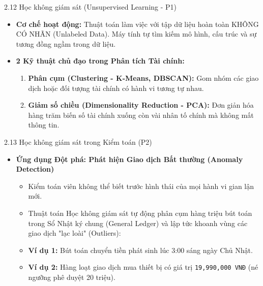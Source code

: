 \documentclass[aspectratio=169]{beamer}
\begin{document}
\begin{frame}{2.12 Học không giám sát (Unsupervised Learning - P1)}
    \begin{itemize}
        \item \textbf{Cơ chế hoạt động:} Thuật toán làm việc với tập dữ liệu hoàn toàn KHÔNG CÓ NHÃN (Unlabeled Data). Máy tính tự tìm kiếm mô hình, cấu trúc và sự tương đồng ngầm trong dữ liệu.
        \item \textbf{2 Kỹ thuật chủ đạo trong Phân tích Tài chính:}
        \begin{enumerate}
            \item \textbf{Phân cụm (Clustering - K-Means, DBSCAN):} Gom nhóm các giao dịch hoặc đối tượng tài chính có hành vi tương tự nhau.
            \item \textbf{Giảm số chiều (Dimensionality Reduction - PCA):} Đơn giản hóa hàng trăm biến số tài chính xuống còn vài nhân tố chính mà không mất thông tin.
        \end{enumerate}
    \end{itemize}
\end{frame}

\begin{frame}{2.13 Học không giám sát trong Kiểm toán (P2)}
    \begin{itemize}
        \item \textbf{Ứng dụng Đột phá: Phát hiện Giao dịch Bất thường (Anomaly Detection)}
        \begin{itemize}
            \item Kiểm toán viên không thể biết trước hình thái của mọi hành vi gian lận mới.
            \item Thuật toán Học không giám sát tự động phân cụm hàng triệu bút toán trong Sổ Nhật ký chung (General Ledger) và lập tức khoanh vùng các giao dịch "lạc loài" (Outliers):
            \item \textbf{Ví dụ 1:} Bút toán chuyển tiền phát sinh lúc 3:00 sáng ngày Chủ Nhật.
            \item \textbf{Ví dụ 2:} Hàng loạt giao dịch mua thiết bị có giá trị \texttt{19,990,000 VNĐ} (né ngưỡng phê duyệt 20 triệu).
        \end{itemize}
    \end{itemize}
\end{frame}
\end{document}
